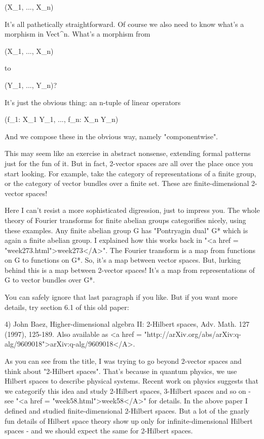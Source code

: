 (X_{1}, ..., X_{n})

It's all pathetically straightforward.  Of course we also need
to know what's a morphism in Vect^{n}.  What's a morphism from 

(X_{1}, ..., X_{n})

to

(Y_{1}, ..., Y_{n})?

It's just the obvious thing: an n-tuple of linear operators

(f_{1}: X_{1} \to  Y_{1}, ..., f_{n}: X_{n} \to  Y_{n})

And we compose these in the obvious way, namely "componentwise".

This may seem like an exercise in abstract nonsense, extending formal 
patterns just for the fun of it.  But in fact, 2-vector spaces are
all over the place once you start looking.  For example, take
the category of representations of a finite group, or the category
of vector bundles over a finite set.  These are finite-dimensional
2-vector spaces!  

Here I can't resist a more sophisticated digression, just to impress
you.  The whole theory of Fourier transforms for finite abelian groups 
categorifies nicely, using these examples.  Any finite abelian group 
G has "Pontryagin dual" G* which is again a finite abelian group.   
I explained how this works back in "<a href = "week273.html">week273</A>".  The Fourier transform 
is a map from functions on G to functions on G*.  So, it's a map 
between vector spaces.  But, lurking behind this is a map between 
2-vector spaces!  It's a map from representations of G to vector 
bundles over G*.

You can safely ignore that last paragraph if you like.  But if you 
want more details, try section 6.1 of this old paper:

4) John Baez, Higher-dimensional algebra II: 2-Hilbert spaces,
Adv. Math. 127 (1997), 125-189.  Also available as 
<a href = "http://arXiv.org/abs/arXiv:q-alg/9609018">arXiv:q-alg/9609018</A>.

As you can see from the title, I was trying to go beyond 2-vector
spaces and think about "2-Hilbert spaces".  That's because
in quantum physics, we use Hilbert spaces to describe physical
systems.  Recent work on physics suggests that we categorify this idea
and study 2-Hilbert spaces, 3-Hilbert spaces and so on - see "<a
href = "week58.html">week58</A>" for details.  In the above paper
I defined and studied finite-dimensional 2-Hilbert spaces.  But a lot
of the gnarly fun details of Hilbert space theory show up only for
infinite-dimensional Hilbert spaces - and we should expect the same
for 2-Hilbert spaces.

